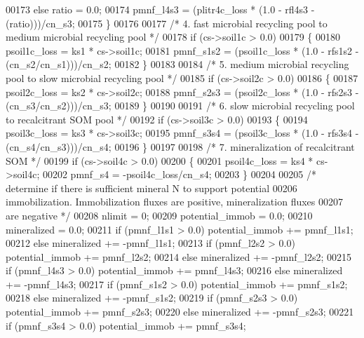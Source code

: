 \begin{DoxyCode}
00173         \textcolor{keywordflow}{else} ratio = 0.0;
00174         pmnf\_l4s3 = (plitr4c\_loss * (1.0 - rfl4s3 - (ratio)))/cn\_s3;
00175     \}
00176     
00177     \textcolor{comment}{/* 4. fast microbial recycling pool to medium microbial recycling pool */}
00178     \textcolor{keywordflow}{if} (cs->soil1c > 0.0)
00179     \{
00180         psoil1c\_loss = ks1 * cs->soil1c;
00181         pmnf\_s1s2 = (psoil1c\_loss * (1.0 - rfs1s2 - (cn\_s2/cn\_s1)))/cn\_s2;
00182     \}
00183     
00184     \textcolor{comment}{/* 5. medium microbial recycling pool to slow microbial recycling pool */}
00185     \textcolor{keywordflow}{if} (cs->soil2c > 0.0)
00186     \{
00187         psoil2c\_loss = ks2 * cs->soil2c;
00188         pmnf\_s2s3 = (psoil2c\_loss * (1.0 - rfs2s3 - (cn\_s3/cn\_s2)))/cn\_s3;
00189     \}
00190     
00191     \textcolor{comment}{/* 6. slow microbial recycling pool to recalcitrant SOM pool */}
00192     \textcolor{keywordflow}{if} (cs->soil3c > 0.0)
00193     \{
00194         psoil3c\_loss = ks3 * cs->soil3c;
00195         pmnf\_s3s4 = (psoil3c\_loss * (1.0 - rfs3s4 - (cn\_s4/cn\_s3)))/cn\_s4;
00196     \}
00197     
00198     \textcolor{comment}{/* 7. mineralization of recalcitrant SOM */}
00199     \textcolor{keywordflow}{if} (cs->soil4c > 0.0)
00200     \{
00201         psoil4c\_loss = ks4 * cs->soil4c;
00202         pmnf\_s4 = -psoil4c\_loss/cn\_s4;
00203     \}
00204     
00205     \textcolor{comment}{/* determine if there is sufficient mineral N to support potential}
00206 \textcolor{comment}{    immobilization. Immobilization fluxes are positive, mineralization fluxes}
00207 \textcolor{comment}{    are negative */}
00208     nlimit = 0;
00209     potential\_immob = 0.0;
00210     mineralized = 0.0;
00211     \textcolor{keywordflow}{if} (pmnf\_l1s1 > 0.0) potential\_immob += pmnf\_l1s1;
00212     \textcolor{keywordflow}{else} mineralized += -pmnf\_l1s1;
00213     \textcolor{keywordflow}{if} (pmnf\_l2s2 > 0.0) potential\_immob += pmnf\_l2s2;
00214     \textcolor{keywordflow}{else} mineralized += -pmnf\_l2s2;
00215     \textcolor{keywordflow}{if} (pmnf\_l4s3 > 0.0) potential\_immob += pmnf\_l4s3;
00216     \textcolor{keywordflow}{else} mineralized += -pmnf\_l4s3;
00217     \textcolor{keywordflow}{if} (pmnf\_s1s2 > 0.0) potential\_immob += pmnf\_s1s2;
00218     \textcolor{keywordflow}{else} mineralized += -pmnf\_s1s2;
00219     \textcolor{keywordflow}{if} (pmnf\_s2s3 > 0.0) potential\_immob += pmnf\_s2s3;
00220     \textcolor{keywordflow}{else} mineralized += -pmnf\_s2s3;
00221     \textcolor{keywordflow}{if} (pmnf\_s3s4 > 0.0) potential\_immob += pmnf\_s3s4;

\end{DoxyCode}
